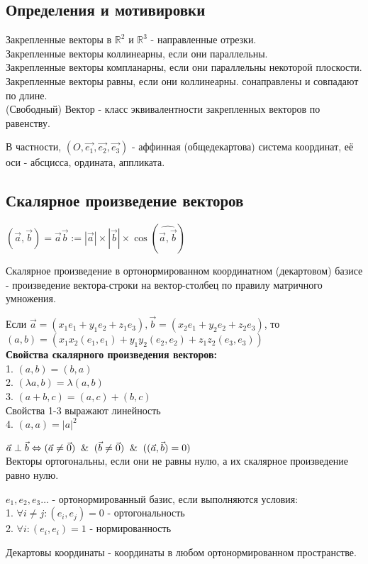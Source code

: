 \subsection{Определения и мотивировки}
\begin{defin}
Закрепленные векторы в $\mathbb{R}^2$ и $\mathbb{R}^3$ - направленные отрезки.\\
Закрепленные векторы коллинеарны, если они параллельны.\\
Закрепленные векторы компланарны, если они параллельны некоторой плоскости.\\
Закрепленные векторы равны, если они коллинеарны. сонаправлены и совпадают
по длине.\\
(Свободный) Вектор - класс эквивалентности закрепленных векторов по равенству.
\end{defin}
В частности, $(O,\Vec{e_1},\Vec{e_2},\Vec{e_3})$ - аффинная (общедекартова)
система координат, её оси - абсцисса, ордината, аппликата. 
\subsection{Скалярное произведение векторов}
\begin{defin}
$(\Vec{a},\Vec{b})=\Vec{a}\Vec{b}:=|\Vec{a}|\times|\Vec{b}|\times
\cos{(\widehat{\Vec{a},\Vec{b}})}$  
\end{defin}
Скалярное произведение в ортонормированном координатном (декартовом) базисе - 
произведение вектора-строки на вектор-столбец по правилу матричного умножения.

Если $\Vec{a}=(x_1e_1+y_1e_2+z_1e_3), \Vec{b}=(x_2e_1+y_2e_2+z_2e_3)$, то
$(a,b)=(x_1x_2(e_1,e_1)+y_1y_2(e_2,e_2)+z_1z_2(e_3,e_3))$\\
\textbf{Свойства скалярного произведения векторов:}\\
1. $(a,b)=(b,a)$\\
2. $(\lambda a,b)=\lambda(a,b) $\\
3. $(a+b,c)=(a,c)+(b,c)$\\
Свойства 1-3 выражают линейность\\
4. $(a,a)=|a|^2$
\begin{defin}
$\Vec{a}\perp\Vec{b}\Leftrightarrow(\Vec{a}\ne\Vec{0})\And(\Vec{b}\ne\Vec{0})
\And((\Vec{a},\Vec{b})=0)$ \\
Векторы ортогональны, если они не равны нулю, а их скалярное произведение
равно нулю.
\end{defin}
\begin{defin}
$e_1,e_2,e_3\ldots$ - ортонормированный базис, если выполняются условия:\\
1. $\forall i\ne j:(e_i,e_j)=0$ - ортогональность\\
2. $\forall i: (e_i,e_i)=1$ - нормированность
\end{defin}
Декартовы координаты - координаты в любом ортонормированном пространстве. 


